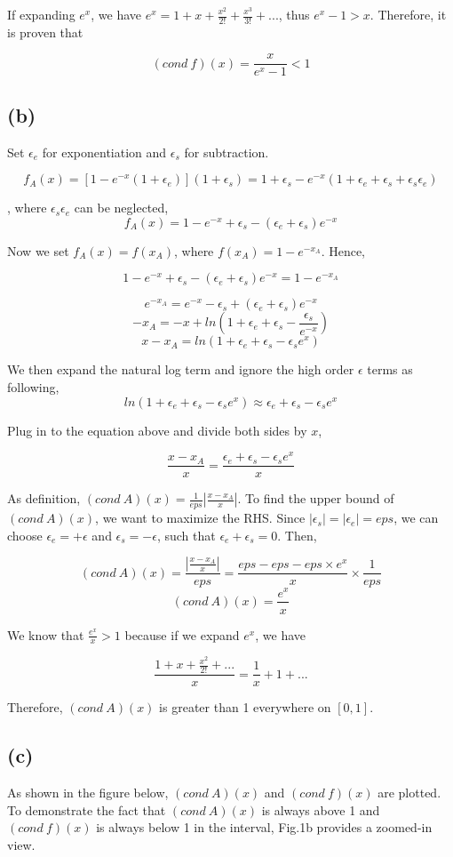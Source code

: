 \documentclass[a4paper, 12pt]{article}
\begin{document}
If expanding $e^x$, we have $e^x = 1 + x + \frac{x^2}{2!} + \frac{x^3}{3!} + ...$, thus $e^x-1 > x$. Therefore, it is proven that

\[(cond\ f)(x) =\frac{x}{e^x-1} < 1\]

\subsection*{(b)}
Set $\epsilon _e$ for exponentiation and $\epsilon_s$ for subtraction.

\[f_A(x) = [1-e^{-x}(1+\epsilon_e)](1+\epsilon_s)=1+\epsilon_s - e^{-x}(1+\epsilon_e+\epsilon_s+\epsilon_s\epsilon_e)\]

, where $\epsilon_s\epsilon_e$ can be neglected,
\[f_A(x) = 1-e^{-x}+\epsilon_s -(\epsilon_e+\epsilon_s)e^{-x}\]

Now we set $f_A(x)=f(x_A)$, where $f(x_A)=1-e^{-x_A}$. Hence,

\[1-e^{-x}+\epsilon_s -(\epsilon_e+\epsilon_s)e^{-x} = 1-e^{-x_A}\]

\[e^{-x_A} = e^{-x}-\epsilon_s + (\epsilon _e +\epsilon _s)e^{-x}\]
\[-x_A = -x + ln(1+\epsilon_e +\epsilon_s-\frac{\epsilon _s}{e^{-x}})\]
\[x-x_A = ln(1+\epsilon_e +\epsilon_s-\epsilon_s e^{x})\]

We then expand the natural log term and ignore the high order $\epsilon$ terms as following,
\[ln(1+\epsilon_e +\epsilon_s-\epsilon_s e^{x}) \approx \epsilon_e +\epsilon_s-\epsilon_s e^{x}\]

Plug in to the equation above and divide both sides by $x$,

\[\frac{x-x_A}{x}= \frac{\epsilon_e +\epsilon_s-\epsilon_s e^{x}}{x}\]

As definition, $(cond\ A)(x) = \frac{1}{eps} |\frac{x-x_A}{x}|$. To find the upper bound of $(cond\ A)(x)$, we want to maximize the RHS. Since $|\epsilon_s|=|\epsilon_e| = eps$, we can choose $\epsilon_e = +\epsilon$ and $\epsilon_s = -\epsilon$, such that $\epsilon_e +\epsilon_s = 0$. Then,

\[(cond\ A)(x) = \frac{|\frac{x-x_A}{x}|}{eps} = \frac{eps - eps -eps\times e^{x}}{x}\times \frac{1}{eps}\]
\[(cond\ A)(x) = \frac{e^x}{x}\]

We know that $\frac{e^x}{x} > 1$ because if we expand $e^x$, we have

\[\frac{1+x+\frac{x^2}{2!}+...}{x} = \frac{1}{x} + 1 + ... \]

Therefore, $(cond\ A)(x)$ is greater than 1 everywhere on $[0,1]$.
\subsection*{(c)}
As shown in the figure below, $(cond\ A)(x)$ and $(cond\ f)(x)$ are plotted. To demonstrate the fact that $(cond\ A)(x)$ is always above 1 and $(cond\ f)(x)$ is always below 1 in the interval, Fig.1b provides a zoomed-in view.
\end{document}
